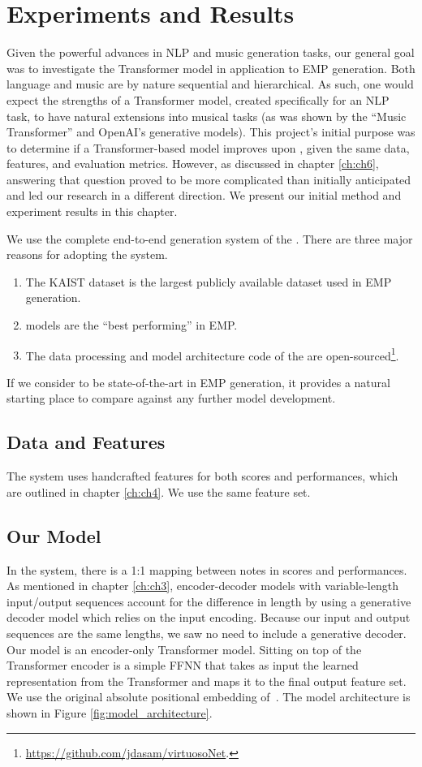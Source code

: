 \chapter{Experiments and Results}\label{ch:ch5}
Given the powerful advances in NLP and music generation tasks, our general goal was to investigate the Transformer model in application to EMP generation. Both language and music are by nature sequential and hierarchical. As such, one would expect the strengths of a Transformer model, created specifically for an NLP task, to have natural extensions into musical tasks (as was shown by the ``Music Transformer'' and OpenAI's generative models).  This project's initial purpose was to determine if a Transformer-based model improves upon \vnet{}, given the same data, features, and evaluation metrics. However, as discussed in chapter \ref{ch:ch6}, answering that question proved to be more complicated than initially anticipated and led our research in a different direction. We present our initial method and experiment results in this chapter. 

We use the complete end-to-end generation system of the \vnetf{}. There are three major reasons for adopting the \vnet{} system. 
\begin{enumerate}
    \item The KAIST dataset is the largest publicly available dataset used in EMP generation.
    \item \vnet{} models are the ``best performing'' in EMP.
    \item The data processing and model architecture code of the \vnetf{} are open-sourced\footnote{\url{https://github.com/jdasam/virtuosoNet}.}.
\end{enumerate}
If we consider \vnet{} to be state-of-the-art in EMP generation, it provides a natural starting place to compare against any further model development. 

\section{Data and Features}
The \vnet{} system uses handcrafted features for both scores and performances, which are outlined in chapter \ref{ch:ch4}. We use the same feature set.

\section{Our Model}
In the \vnet{} system, there is a 1:1 mapping between notes in scores and performances. As mentioned in chapter \ref{ch:ch3}, encoder-decoder \seq{} models with variable-length input/output sequences account for the difference in length by using a generative decoder model which relies on the input encoding. Because our input and output sequences are the same lengths, we saw no need to include a generative decoder. Our model is an encoder-only Transformer model. Sitting on top of the Transformer encoder is a simple FFNN that takes as input the learned representation from the Transformer and maps it to the final output feature set. We use the original absolute positional embedding of~\citet{vaswani2017attention}. The model architecture is shown in Figure \ref{fig:model_architecture}.

